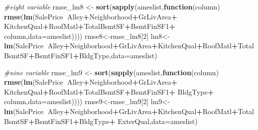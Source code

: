 \documentclass[]{article}
\newenvironment{Shaded}{\begin{snugshade}}{\end{snugshade}}
\newcommand{\CommentTok}[1]{\textcolor[rgb]{0.56,0.35,0.01}{\textit{#1}}}
\newcommand{\ControlFlowTok}[1]{\textcolor[rgb]{0.13,0.29,0.53}{\textbf{#1}}}
\newcommand{\DataTypeTok}[1]{\textcolor[rgb]{0.13,0.29,0.53}{#1}}
\newcommand{\DecValTok}[1]{\textcolor[rgb]{0.00,0.00,0.81}{#1}}
\newcommand{\KeywordTok}[1]{\textcolor[rgb]{0.13,0.29,0.53}{\textbf{#1}}}
\newcommand{\NormalTok}[1]{#1}
\newcommand{\OperatorTok}[1]{\textcolor[rgb]{0.81,0.36,0.00}{\textbf{#1}}}
\newcommand{\StringTok}[1]{\textcolor[rgb]{0.31,0.60,0.02}{#1}}
\begin{document}
\begin{Shaded}
\begin{Highlighting}[]
\CommentTok{#eight variable}
\NormalTok{rmse_lm8 <-}\StringTok{ }\KeywordTok{sort}\NormalTok{(}\KeywordTok{sapply}\NormalTok{(ameslist,}\ControlFlowTok{function}\NormalTok{(column) }\KeywordTok{rmse}\NormalTok{(}\KeywordTok{lm}\NormalTok{(SalePrice}\OperatorTok{~}\NormalTok{Alley}\OperatorTok{+}\NormalTok{Neighborhood}\OperatorTok{+}\NormalTok{GrLivArea}\OperatorTok{+}
\StringTok{                                                            }\NormalTok{KitchenQual}\OperatorTok{+}\NormalTok{RoofMatl}\OperatorTok{+}\NormalTok{TotalBsmtSF}\OperatorTok{+}\NormalTok{BsmtFinSF1}\OperatorTok{+}
\StringTok{                                                            }\NormalTok{column,}\DataTypeTok{data=}\NormalTok{ameslist))))}
\NormalTok{rmse8<-rmse_lm8[}\DecValTok{2}\NormalTok{]}
\NormalTok{lm8<-}\StringTok{ }\KeywordTok{lm}\NormalTok{(SalePrice}\OperatorTok{~}\NormalTok{Alley}\OperatorTok{+}\NormalTok{Neighborhood}\OperatorTok{+}\NormalTok{GrLivArea}\OperatorTok{+}\NormalTok{KitchenQual}\OperatorTok{+}\NormalTok{RoofMatl}\OperatorTok{+}\NormalTok{TotalBsmtSF}\OperatorTok{+}\NormalTok{BsmtFinSF1}\OperatorTok{+}\NormalTok{BldgType,}\DataTypeTok{data=}\NormalTok{ameslist)}

\CommentTok{#nine variable}
\NormalTok{rmse_lm9 <-}\StringTok{ }\KeywordTok{sort}\NormalTok{(}\KeywordTok{sapply}\NormalTok{(ameslist,}\ControlFlowTok{function}\NormalTok{(column) }\KeywordTok{rmse}\NormalTok{(}\KeywordTok{lm}\NormalTok{(SalePrice}\OperatorTok{~}\NormalTok{Alley}\OperatorTok{+}\NormalTok{Neighborhood}\OperatorTok{+}\NormalTok{GrLivArea}\OperatorTok{+}
\StringTok{                                                            }\NormalTok{KitchenQual}\OperatorTok{+}\NormalTok{RoofMatl}\OperatorTok{+}\NormalTok{TotalBsmtSF}\OperatorTok{+}\NormalTok{BsmtFinSF1}\OperatorTok{+}
\StringTok{                                                            }\NormalTok{BldgType}\OperatorTok{+}
\StringTok{                                                            }\NormalTok{column,}\DataTypeTok{data=}\NormalTok{ameslist))))}
\NormalTok{rmse9<-rmse_lm9[}\DecValTok{2}\NormalTok{]}
\NormalTok{lm9<-}\KeywordTok{lm}\NormalTok{(SalePrice}\OperatorTok{~}\NormalTok{Alley}\OperatorTok{+}\NormalTok{Neighborhood}\OperatorTok{+}\NormalTok{GrLivArea}\OperatorTok{+}\NormalTok{KitchenQual}\OperatorTok{+}\NormalTok{RoofMatl}\OperatorTok{+}\NormalTok{TotalBsmtSF}\OperatorTok{+}\NormalTok{BsmtFinSF1}\OperatorTok{+}\NormalTok{BldgType}\OperatorTok{+}
\StringTok{          }\NormalTok{ExterQual,}\DataTypeTok{data=}\NormalTok{ameslist)}


\end{Highlighting}
\end{Shaded}
\end{document}
